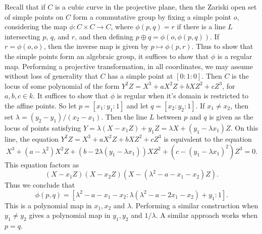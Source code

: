 \begin{example}
    Recall that if $C$ is a cubic curve in the projective plane, then the Zariski open set of simple points on $C$ form a commutative group by fixing a simple point $o$, considering the map $\phi: C \times C \to C$, where $\phi(p,q) = r$ if there is a line $L$ intersecting $p$, $q$, and $r$, and then defining $p \oplus q = \phi(o,\phi(p,q))$. If $r = \phi(o,o)$, then the inverse map is given by $p \mapsto \phi(p,r)$. Thus to show that the simple points form an algebraic group, it suffices to show that $\phi$ is a regular map. Performing a projective transformation, in all coordinates, we may assume without loss of generality that $C$ has a simple point at $[0:1:0]$. Then $C$ is the locus of some polynomial of the form $Y^2Z = X^3 + aX^2Z + bXZ^2 + cZ^3$, for $a,b,c \in k$. It suffices to show that $\phi$ is regular when it's domain is restricted to the affine points. So let $p = [x_1:y_1:1]$ and let $q = [x_2:y_2:1]$. If $x_1 \neq x_2$, then set $\lambda = (y_2 - y_1)/(x_2 - x_1)$. Then the line $L$ between $p$ and $q$ is given as the locus of points satisfying $Y = \lambda (X - x_1 Z) + y_1 Z = \lambda X + (y_1 - \lambda x_1)Z$. On this line, the equation $Y^2Z = X^3 + aX^2Z + bXZ^2 + cZ^3$ is equivalent to the equation
    \[ X^3 + (a - \lambda^2) X^2 Z + (b - 2\lambda(y_1 - \lambda x_1)) XZ^2 + (c - (y_1 - \lambda x_1)^2)Z^3 = 0. \]
    This equation factors as
    \[ (X - x_1 Z)(X - x_2 Z)(X - (\lambda^2 - a - x_1 - x_2) Z). \]
    Thus we conclude that
    \[ \phi(p,q) = [\lambda^2 - a - x_1 - x_2: \lambda (\lambda^2 - a - 2x_1 - x_2) + y_1 : 1]. \]
    This is a polynomial map in $x_1,x_2$ and $\lambda$. Performing a similar construction when $y_1 \neq y_2$ gives a polynomial map in $y_1,y_2$ and $1/\lambda$. A similar approach works when $p = q$.
\end{example}

